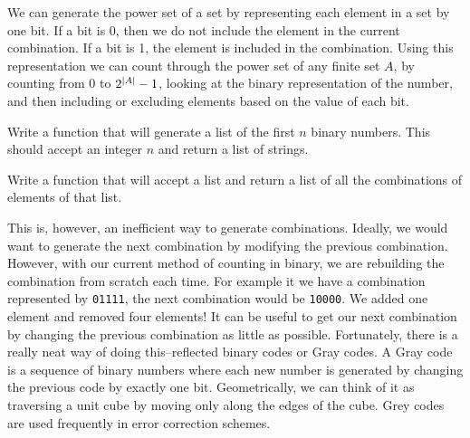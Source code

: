 We can generate the power set of a set by representing each element in a set by one bit.
If a bit is 0, then we do not include the element in the current combination.  If a
bit is 1, the element is included in the combination.
Using this representation we can count through the power set of any finite set $A$, by counting from 0 to $2^{\left\lvert A\right\rvert}-1$, looking at the binary representation of the number, and then including or excluding elements based on the value of each bit.

\begin{problem}
Write a function that will generate a list of the first $n$ binary numbers.  This should accept an integer $n$ and return a list of strings.
\end{problem}

\begin{problem}
Write a function that will accept a list and return a list of all the combinations
of elements of that list.
\end{problem}

This is, however, an inefficient way to generate combinations.  Ideally, we would want
to generate the next combination by modifying the previous combination.  However, with
our current method of counting in binary, we are rebuilding the combination from scratch
each time.  For example it we have a combination represented by \texttt{01111}, the next
combination would be \texttt{10000}.  We added one element and removed four elements!
It can be useful to get our next combination by changing the previous combination as little as possible.
Fortunately, there is a really neat way of doing this--reflected binary codes or Gray codes. 
A Gray code is a sequence of binary numbers where each new number is generated by
changing the previous code by exactly one bit.  Geometrically, we can think of it as
traversing a unit cube by moving only along the edges of the cube.
Grey codes are used frequently in error correction schemes.

